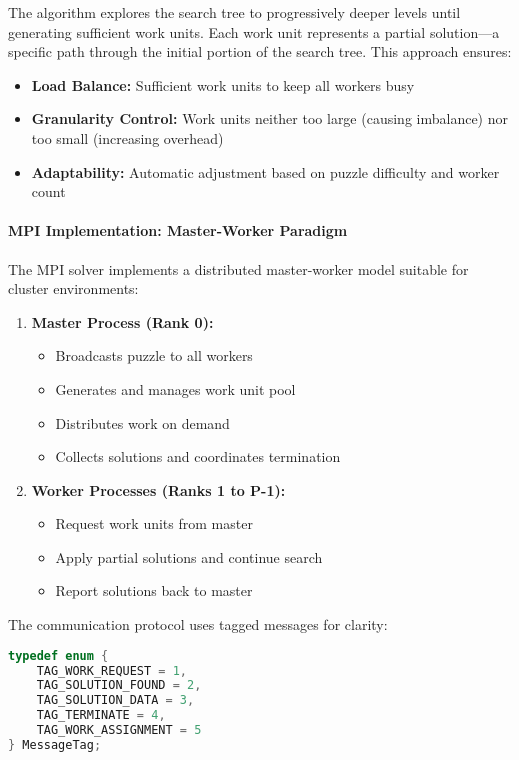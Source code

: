 The algorithm explores the search tree to progressively deeper levels until generating sufficient work units. Each work unit represents a partial solution—a specific path through the initial portion of the search tree. This approach ensures:
\begin{itemize}
    \item \textbf{Load Balance:} Sufficient work units to keep all workers busy
    \item \textbf{Granularity Control:} Work units neither too large (causing imbalance) nor too small (increasing overhead)
    \item \textbf{Adaptability:} Automatic adjustment based on puzzle difficulty and worker count
\end{itemize}

\paragraph{MPI Implementation: Master-Worker Paradigm}
\label{par:mpi_implementation}
The MPI solver implements a distributed master-worker model suitable for cluster environments:

\begin{enumerate}
    \item \textbf{Master Process (Rank 0):}
    \begin{itemize}
        \item Broadcasts puzzle to all workers
        \item Generates and manages work unit pool
        \item Distributes work on demand
        \item Collects solutions and coordinates termination
    \end{itemize}
    
    \item \textbf{Worker Processes (Ranks 1 to P-1):}
    \begin{itemize}
        \item Request work units from master
        \item Apply partial solutions and continue search
        \item Report solutions back to master
    \end{itemize}
\end{enumerate}

The communication protocol uses tagged messages for clarity:

\begin{lstlisting}[language=C, caption=MPI communication tags]
typedef enum {
    TAG_WORK_REQUEST = 1,
    TAG_SOLUTION_FOUND = 2,
    TAG_SOLUTION_DATA = 3,
    TAG_TERMINATE = 4,
    TAG_WORK_ASSIGNMENT = 5
} MessageTag;
\end{lstlisting}

